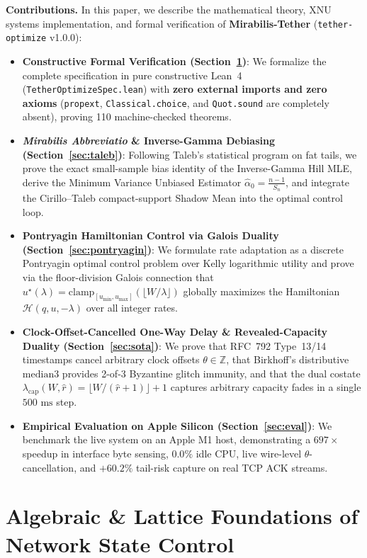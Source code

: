 \documentclass[11pt,a4paper]{article}
\theoremstyle{definition}
\begin{document}
\textbf{Contributions.} In this paper, we describe the mathematical theory, XNU systems implementation, and formal verification of \textbf{Mirabilis-Tether} (\texttt{tether-optimize} v1.0.0):
\begin{itemize}[leftmargin=2em]
  \item \textbf{Constructive Formal Verification (Section~\ref{sec:lattice})}: We formalize the complete specification in pure constructive Lean~4 (\texttt{TetherOptimizeSpec.lean}) with \textbf{zero external imports and zero axioms} (\texttt{propext}, \texttt{Classical.choice}, and \texttt{Quot.sound} are completely absent), proving 110 machine-checked theorems.
  \item \textbf{\emph{Mirabilis Abbreviatio} \& Inverse-Gamma Debiasing (Section~\ref{sec:taleb})}: Following Taleb's statistical program on fat tails, we prove the exact small-sample bias identity of the Inverse-Gamma Hill MLE, derive the Minimum Variance Unbiased Estimator $\widehat{\alpha}_0 = \frac{n-1}{S_n}$, and integrate the Cirillo--Taleb compact-support Shadow Mean into the optimal control loop.
  \item \textbf{Pontryagin Hamiltonian Control via Galois Duality (Section~\ref{sec:pontryagin})}: We formulate rate adaptation as a discrete Pontryagin optimal control problem over Kelly logarithmic utility and prove via the floor-division Galois connection that $u^\star(\lambda) = \mathrm{clamp}_{[u_{\min}, u_{\max}]}(\lfloor W / \lambda \rfloor)$ globally maximizes the Hamiltonian $\mathcal{H}(q, u, -\lambda)$ over all integer rates.
  \item \textbf{Clock-Offset-Cancelled One-Way Delay \& Revealed-Capacity Duality (Section~\ref{sec:sota})}: We prove that RFC~792 Type~13/14 timestamps cancel arbitrary clock offsets $\theta \in \mathbb{Z}$, that Birkhoff's distributive $\mathrm{median3}$ provides 2-of-3 Byzantine glitch immunity, and that the dual costate $\lambda_{\mathrm{cap}}(W, \hat{r}) = \lfloor W / (\hat{r} + 1) \rfloor + 1$ captures arbitrary capacity fades in a single $500\text{ ms}$ step.
  \item \textbf{Empirical Evaluation on Apple Silicon (Section~\ref{sec:eval})}: We benchmark the live system on an Apple M1 host, demonstrating a $697\times$ speedup in interface byte sensing, $0.0\%$ idle CPU, live wire-level $\theta$-cancellation, and $+60.2\%$ tail-risk capture on real TCP ACK streams.
\end{itemize}

\section{Algebraic \& Lattice Foundations of Network State Control}
\label{sec:lattice}
\end{document}

